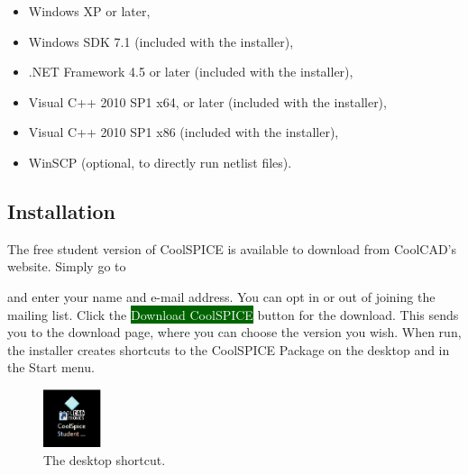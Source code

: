 \begin{itemize}
\item Windows XP or later,
\item Windows SDK 7.1 (included with the installer),
\item .NET Framework 4.5 or later (included with the installer),
\item Visual C++ 2010 SP1 x64, or later (included with the installer),
\item Visual C++ 2010 SP1 x86 (included with the installer),
\item WinSCP (optional, to directly run netlist files).
\end{itemize}

\subsection{Installation}

The free student version of CoolSPICE is available to download from CoolCAD's website. Simply go to 

\begin{center}
\end{center}and enter your name and e-mail address.  You can opt in or out of joining the mailing list.  Click the {\colorbox{darkgreen}{\textcolor{white}{Download CoolSPICE}}} button for the download.  This sends you to the download page, where you can choose the version you wish.  When run, the installer creates shortcuts to the CoolSPICE Package on the desktop and in the Start menu.


\begin{figure}
  \begin{center}
    \includegraphics[width=0.15\textwidth]
	{./figures/getting_started_figures/CoolSPICEstudent_logo_shortcut.eps}
  \end{center}
  \caption{The desktop shortcut.}
  \label{fig_desktop_shortcut}
\end{figure}

